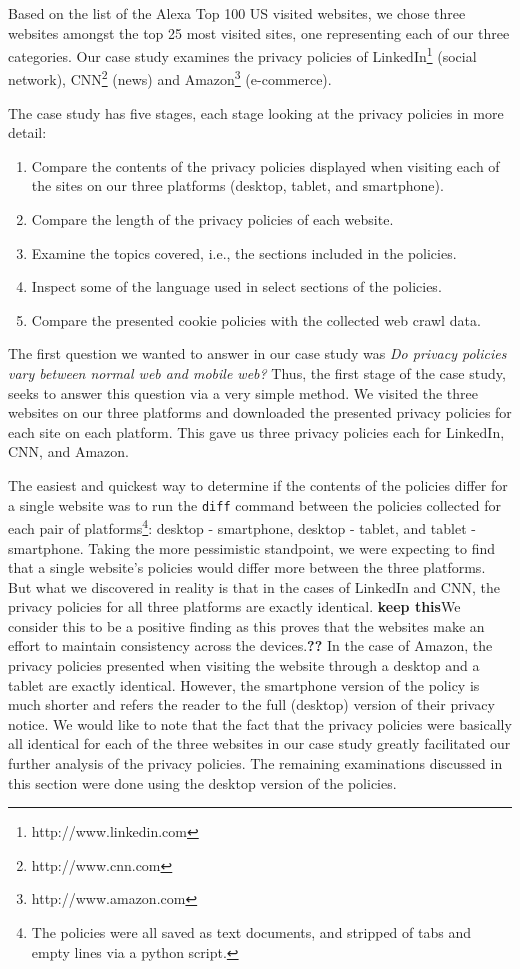 \documentclass{acm_proc_article-sp}
\begin{document}
Based on the list of the Alexa Top 100 US visited websites, we chose three websites amongst the top 25 most visited sites, one representing each of our three categories. Our case study examines the privacy policies of LinkedIn\footnote{http://www.linkedin.com} (social network), CNN\footnote{http://www.cnn.com} (news) and Amazon\footnote{http://www.amazon.com} (e-commerce).

The case study has five stages, each stage looking at the privacy policies in more detail:
\begin{enumerate}
\item Compare the contents of the privacy policies displayed when visiting each of the sites on our three platforms (desktop, tablet, and smartphone).
\item Compare the length of the privacy policies of each website.
\item Examine the topics covered, i.e., the sections included in the policies.
\item Inspect some of the language used in select sections of the policies.
\item Compare the presented cookie policies with the collected web crawl data.
\end{enumerate}

The first question we wanted to answer in our case study was \emph{Do privacy policies vary between normal web and mobile web?} Thus, the first stage of the case study, seeks to answer this question via a very simple method. We visited the three websites on our three platforms and downloaded the presented privacy policies for each site on each platform. This gave us three privacy policies each for LinkedIn, CNN, and Amazon. 

The easiest and quickest way to determine if the contents of the policies differ for a single website was to run the \texttt{diff} command between the policies collected for each pair of platforms\footnote{The policies were all saved as text documents, and stripped of tabs and empty lines via a python script.}: desktop - smartphone, desktop - tablet, and tablet - smartphone. Taking the more pessimistic standpoint, we were expecting to find that a single website's policies would differ more between the three platforms. But what we discovered in reality is that in the cases of LinkedIn and CNN, the privacy policies for all three platforms are exactly identical. \textbf{keep this}We consider this to be a positive finding as this proves that the websites make an effort to maintain consistency across the devices.\textbf{??} In the case of Amazon, the privacy policies presented when visiting the website through a desktop and a tablet are exactly identical. However, the smartphone version of the policy is much shorter and refers the reader to the full (desktop) version of their privacy notice. We would like to note that the fact that the privacy policies were basically all identical for each of the three websites in our case study greatly facilitated our further analysis of the privacy policies. The remaining examinations discussed in this section were done using the desktop version of the policies.
\end{document}
